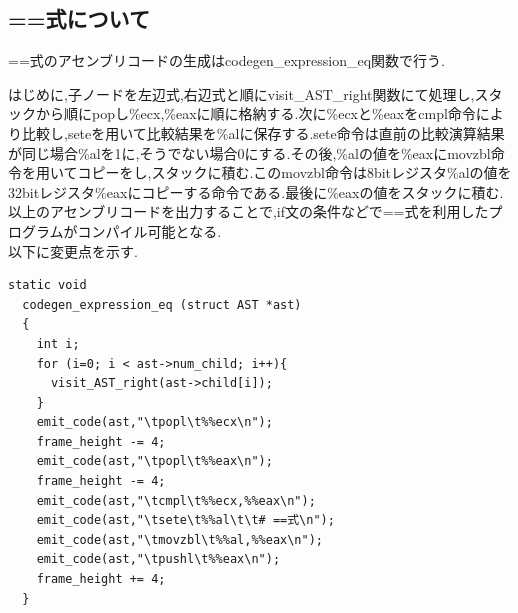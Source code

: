 \documentclass[10pt]{jsarticle}
\begin{document}
\subsection{==式について}
==式のアセンブリコードの生成はcodegen\_expression\_eq関数で行う.
\par  はじめに,子ノードを左辺式,右辺式と順にvisit\_AST\_right関数にて処理し,スタックから順にpopし\%ecx,\%eaxに順に格納する.次に\%ecxと\%eaxをcmpl命令により比較し,seteを用いて比較結果を\%alに保存する.sete命令は直前の比較演算結果が同じ場合\%alを1に,そうでない場合0にする.その後,\%alの値を\%eaxにmovzbl命令を用いてコピーをし,スタックに積む.このmovzbl命令は8bitレジスタ\%alの値を32bitレジスタ\%eaxにコピーする命令である.最後に\%eaxの値をスタックに積む.以上のアセンブリコードを出力することで,if文の条件などで==式を利用したプログラムがコンパイル可能となる.\\
以下に変更点を示す.
\begin{lstlisting}[caption=codegen\_expression\_eq関数]
  static void
  codegen_expression_eq (struct AST *ast)
  {
    int i;
    for (i=0; i < ast->num_child; i++){
      visit_AST_right(ast->child[i]);
    }
    emit_code(ast,"\tpopl\t%%ecx\n");
    frame_height -= 4;
    emit_code(ast,"\tpopl\t%%eax\n");
    frame_height -= 4;
    emit_code(ast,"\tcmpl\t%%ecx,%%eax\n");
    emit_code(ast,"\tsete\t%%al\t\t# ==式\n");
    emit_code(ast,"\tmovzbl\t%%al,%%eax\n");
    emit_code(ast,"\tpushl\t%%eax\n");
    frame_height += 4;
  }
\end{lstlisting}
\end{document}
